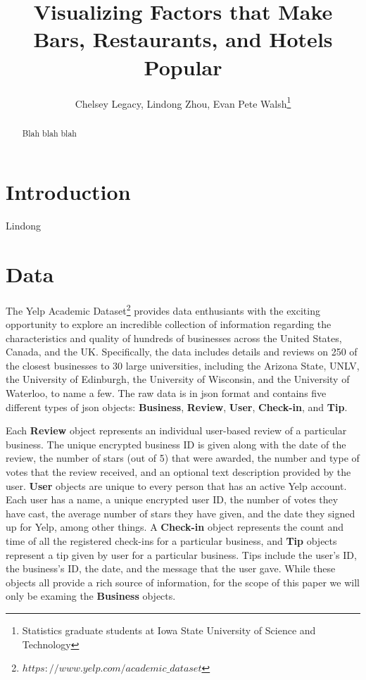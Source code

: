 \documentclass[11pt]{article}
\begin{document}
\author{Chelsey Legacy, Lindong Zhou, Evan Pete Walsh\footnote{Statistics graduate students at Iowa State University of Science and Technology}}
\title{Visualizing Factors that Make Bars, Restaurants, and Hotels Popular}
\maketitle

\begin{abstract}
Blah blah blah
\end{abstract}

\newpage

\tableofcontents

\newpage

\pagestyle{fancy}
\rhead{\thepage}
\rfoot{\today}
\cfoot{}%


\section{Introduction}

Lindong


\section{Data}

The Yelp Academic Dataset\footnote{$https://www.yelp.com/academic\_dataset$} provides data enthusiants with the exciting opportunity to explore an incredible collection of information regarding the characteristics and quality of hundreds of businesses across the United States, Canada, and the UK. Specifically, the data includes details and reviews on 250 of the closest businesses to 30 large universities, including the Arizona State, UNLV, the University of Edinburgh, the University of Wisconsin, and the University of Waterloo, to name a few. The raw data is in json format and contains five different types of json objects: \textbf{Business}, \textbf{Review}, \textbf{User}, \textbf{Check-in}, and \textbf{Tip}.

Each \textbf{Review} object represents an individual user-based review of a particular business. The unique encrypted business ID is given along with the date of the review, the number of stars (out of 5) that were awarded, the number and type of votes that the review received, and an optional text description provided by the user. \textbf{User} objects are unique to every person that has an active Yelp account. Each user has a name, a unique encrypted user ID, the number of votes they have cast, the average number of stars they have given, and the date they signed up for Yelp, among other things. A \textbf{Check-in} object represents the count and time of all the registered check-ins for a particular business, and \textbf{Tip} objects represent a tip given by user for a particular business. Tips include the user's ID, the business's ID, the date, and the message that the user gave. While these objects all provide a rich source of information, for the scope of this paper we will only be examing the \textbf{Business} objects.
\end{document}
